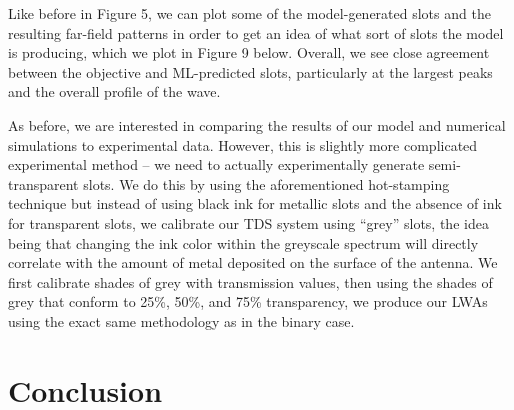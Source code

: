 \documentclass[11pt]{article}
\begin{document}
\noindent Like before in Figure 5, we can plot some of the model-generated slots and the resulting far-field patterns in order to get an idea of what sort of slots the model is producing, which we plot in Figure 9 below. Overall, we see close agreement between the objective and ML-predicted slots, particularly at the largest peaks and the overall profile of the wave.


\noindent As before, we are interested in comparing the results of our model and numerical simulations to experimental data. However, this is slightly more complicated experimental method -- we need to actually experimentally generate semi-transparent slots. We do this by using the aforementioned hot-stamping technique but instead of using black ink for metallic slots and the absence of ink for transparent slots, we calibrate our TDS system using ``grey'' slots, the idea being that changing the ink color within the greyscale spectrum will directly correlate with the amount of metal deposited on the surface of the antenna. We first calibrate shades of grey with transmission values, then using the shades of grey that conform to 25\%, 50\%, and 75\% transparency, we produce our LWAs using the exact same methodology as in the binary case.

\section*{Conclusion}



\end{document}
